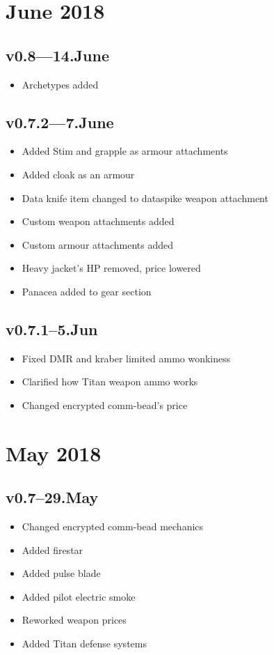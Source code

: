 \documentclass[9pt, openany]{extbook}
\begin{document}
{\small

\section{June 2018}

\subsection{v0.8---14.June}
\begin{itemize}[noitemsep]
\item Archetypes added
\end{itemize}

\subsection{v0.7.2---7.June}
\begin{itemize}[noitemsep]
\item Added Stim and grapple as armour attachments
\item Added cloak as an armour
\item Data knife item changed to dataspike weapon attachment
\item Custom weapon attachments added
\item Custom armour attachments added
\item Heavy jacket's HP removed, price lowered
\item Panacea added to gear section
\end{itemize}


\subsection{v0.7.1--5.Jun}
\begin{itemize}[noitemsep]
\item Fixed DMR and kraber limited ammo wonkiness
\item Clarified how Titan weapon ammo works
\item Changed encrypted comm-bead's price
\end{itemize}

\section{May 2018}

\subsection{v0.7--29.May}
\begin{itemize}[noitemsep]
\item Changed encrypted comm-bead mechanics
\item Added firestar
\item Added pulse blade
\item Added pilot electric smoke
\item Reworked weapon prices
\item Added Titan defense systems
\end{itemize}

}
\end{document}
